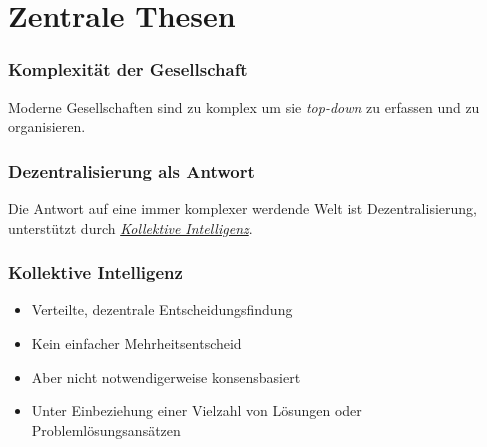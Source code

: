 \section{Zentrale Thesen}
\begin{frame}[label=complexity]
	\frametitle{Komplexität der Gesellschaft}
	Moderne Gesellschaften sind zu komplex um sie \textit{top-down} zu erfassen und zu organisieren.
\end{frame}


\begin{frame}[label=decentral]
	\frametitle{Dezentralisierung als Antwort}

	Die Antwort auf eine immer komplexer werdende Welt ist Dezentralisierung, unterstützt durch \hyperlink{collective_intel}{\textit{Kollektive Intelligenz}}.
\end{frame}

\begin{frame}[label=collective_intel]
	\frametitle{Kollektive Intelligenz}
	\begin{itemize}
		\item
			Verteilte, dezentrale Entscheidungsfindung
		\item
			Kein einfacher Mehrheitsentscheid
		\item
			Aber nicht notwendigerweise konsensbasiert
		\item
			Unter Einbeziehung einer Vielzahl von Lösungen oder Problemlösungsansätzen
	\end{itemize}
\end{frame}




